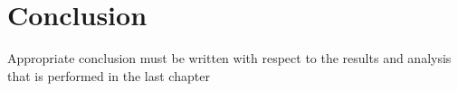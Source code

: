 \chapter{Conclusion}


Appropriate conclusion must be written with respect to the results and analysis that is performed in the last chapter


